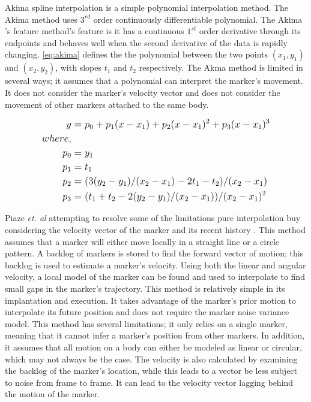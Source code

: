 Akima spline interpolation \cite{wang2014real} is a simple polynomial interpolation method. The Akima method uses $3^{rd}$ order continuously differentiable polynomial. The Akima 's feature method's feature is it has a continuous $1^{st}$  order derivative through its endpoints and behaves well when the second derivative of the data is rapidly changing. \autoref{eq:akima} defines the the polynomial between the two points $(x_{1}, y_{1})$ and $(x_{2}, y_{2})$, with slopes $t_{1}$ and $t_{2}$ respectively. The Akma method is limited in several ways; it assumes that a polynomial can interpret the marker's movement. It does not consider the marker's velocity vector and does not consider the movement of other markers attached to the same body. 

\begin{equation} \label{eq:akima}
\large
\begin{split}
        y &= p_{0} + p_{1}(x - x_{1}) + p_{2}(x - x_{1})^{2} + p_{3}(x - x_{1})^{3} \\
        where, \\
          p_{0} &= y_{1} \\
    p_{1} &= t_{1} \\
    p_{2} &= (3(y_{2} - y_{1})/(x_{2} - x_{1}) - 2t_{1} - t_{2})/(x_{2} - x_{1}) \\
    p_{3} &= (t_{1} + t_{2} - 2(y_{2} - y_{1})/(x_{2} - x_{1}))/(x_{2} - x_{1})^{2}
\end{split}
\end{equation}

Piaze \textit{et. al} attempting to resolve some of the limitations pure interpolation buy considering the velocity vector of the marker and its recent history \cite{piazza2009towards}. This method assumes that a marker will either move locally in a straight line or a circle pattern. A backlog of markers is stored to find the forward vector of motion; this backlog is used to estimate a marker's velocity. Using both the linear and angular velocity, a local model of the marker can be found and used to interpolate to find small gaps in the marker's trajectory. This method is relatively simple in its implantation and execution. It takes advantage of the marker's prior motion to interpolate its future position and does not require the marker noise variance model. This method has several limitations; it only relies on a single marker, meaning that it cannot infer a marker's position from other markers. In addition, it assumes that all motion on a body can either be modeled as linear or circular, which may not always be the case. The velocity is also calculated by examining the backlog of the marker's location, while this leads to a vector be less subject to noise from frame to frame. It can lead to the velocity vector lagging behind the motion of the marker. 

